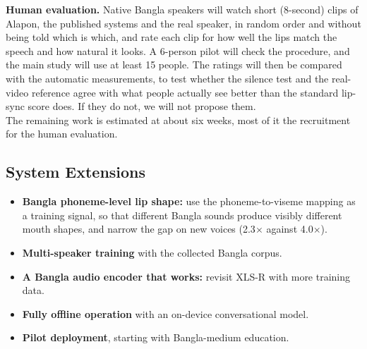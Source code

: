 \noindent
\textbf{Human evaluation.} Native Bangla speakers will watch short (8-second) clips of Alapon, the published systems and the real speaker, in random order and without being told which is which, and rate each clip for how well the lips match the speech and how natural it looks. A 6-person pilot will check the procedure, and the main study will use at least 15 people. The ratings will then be compared with the automatic measurements, to test whether the silence test and the real-video reference agree with what people actually see better than the standard lip-sync score does. If they do not, we will not propose them.\\

\noindent
The remaining work is estimated at about six weeks, most of it the recruitment for the human evaluation.

\subsection{System Extensions}

\begin{itemize}
    \item \textbf{Bangla phoneme-level lip shape:} use the phoneme-to-viseme mapping as a training signal, so that different Bangla sounds produce visibly different mouth shapes, and narrow the gap on new voices (2.3$\times$ against 4.0$\times$).
    \item \textbf{Multi-speaker training} with the collected Bangla corpus.
    \item \textbf{A Bangla audio encoder that works:} revisit XLS-R with more training data.
    \item \textbf{Fully offline operation} with an on-device conversational model.
    \item \textbf{Pilot deployment}, starting with Bangla-medium education.
\end{itemize}
